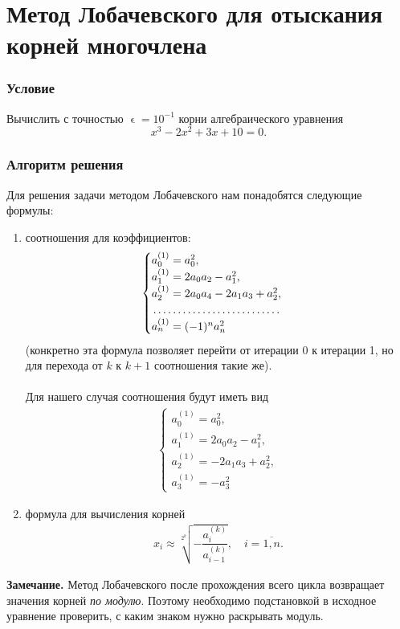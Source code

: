 \documentclass[a4paper, 12pt]{article}
\renewcommand{\epsilon}{\upvarepsilon}
\begin{document}
	\section*{Метод Лобачевского для отыскания корней многочлена}
	\subsubsection*{Условие}
	Вычислить с точностью $\epsilon=10^{-1}$ корни алгебраического уравнения $$x^3-2x^2+3x +10 = 0.$$
	\subsubsection*{Алгоритм решения}
	Для решения задачи методом Лобачевского нам понадобятся следующие формулы:
\begin{enumerate}
	\item соотношения для коэффициентов: 
	\begin{eqnarray}
		\begin{cases}
			a_0^{(1)} = a_0^2,\\
			a_1^{(1)} =2a_0a_2 - a_1^2,\\
			a_2^{(1)} = 2a_0a_4 - 2a_1a_3 + a_2^2,\\
			\dotfill\\
			a_n^{(1)} = (-1)^na_n^2
		\end{cases}
	\end{eqnarray}
	(конкретно эта формула позволяет перейти от итерации 0 к итерации 1, но для перехода от $k$ к $k+1$ соотношения такие же).\\\\
	Для нашего случая соотношения будут иметь вид
	\begin{eqnarray}
		\begin{cases}
			a_0^{(1)} = a_0^2,\\
			a_1^{(1)} =2a_0a_2 - a_1^2,\\
			a_2^{(1)} = - 2a_1a_3 + a_2^2,\\
			a_3^{(1)} = -a_3^2
		\end{cases}
	\end{eqnarray}
	\item формула для вычисления корней \begin{eqnarray}
		x_i\approx\sqrt[2^k]{ - \dfrac{a_i^{(k)}}{a_{i-1}^{(k)}}},\quad i =\overline{1,n}.
	\end{eqnarray}
\end{enumerate} 
\textbf{Замечание.} Метод Лобачевского после прохождения всего цикла возвращает значения корней \textit{по модулю}. Поэтому необходимо подстановкой в исходное уравнение проверить, с каким знаком нужно раскрывать модуль.\\\\
\end{document}
